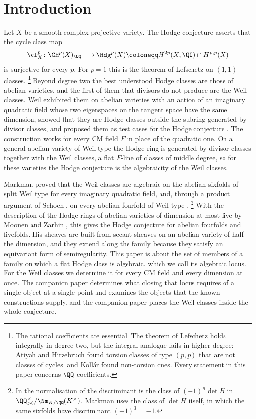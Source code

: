 \section{Introduction}\label{sec:intro}


Let $X$ be a smooth complex projective variety. The Hodge conjecture asserts
that the cycle class map
\[
  \cl^{p}_{X}\colon \CH^{p}(X)_{\QQ}\longrightarrow \Hdg^{p}(X)
  \coloneqq H^{2p}(X,\QQ)\cap H^{p,p}(X)
\]
is surjective for every $p$. For $p=1$ this is the theorem of Lefschetz on
$(1,1)$ classes.%
\footnote{The rational coefficients are essential. The theorem of Lefschetz
holds integrally in degree two, but the integral analogue fails in higher
degree: Atiyah and Hirzebruch found torsion classes of type $(p,p)$ that are
not classes of cycles, and Koll\'ar found non-torsion ones. Every statement in
this paper concerns $\QQ$-coefficients.}
Beyond degree two the best understood Hodge classes are those of abelian
varieties, and the first of them that divisors do not produce are the Weil
classes. Weil exhibited them on abelian varieties with an action of an
imaginary quadratic field whose two eigenspaces on the tangent space have the
same dimension, showed that they are Hodge classes outside the subring
generated by divisor classes, and proposed them as test cases for the Hodge
conjecture \cite{Weil77}. The construction works for every CM field $F$ in
place of the quadratic one. On a general abelian variety of Weil type the
Hodge ring is generated by divisor classes together with the Weil classes, a
flat $F$-line of classes of middle degree, so for these varieties the Hodge
conjecture is the algebraicity of the Weil classes.

Markman proved that the Weil classes are algebraic on the abelian sixfolds of
split Weil type for every imaginary quadratic field, and, through a product
argument of Schoen \cite[Proposition~10]{Sch98}, on every abelian fourfold of
Weil type \cite{Mar25a,Mar25b}.%
\footnote{In the normalisation of  the discriminant is the
class of $(-1)^{n}\det H$ in $\QQ^{\times}_{>0}/\Nm_{K/\QQ}(K^{\times})$.
Markman uses the class of $\det H$ itself, in which the same sixfolds have
discriminant $(-1)^{3}=-1$.}
With the description of the Hodge rings of abelian varieties of dimension at
most five by Moonen and Zarhin \cite{MZ99}, this gives the Hodge conjecture
for abelian fourfolds and fivefolds. His sheaves are built from secant sheaves
on an abelian variety of half the dimension, and they extend along the family
because they satisfy an equivariant form of semiregularity. This paper is
about the set of members of a family on which a flat Hodge class is
algebraic, which we call its algebraic locus. For the Weil classes we
determine it for every CM field and every dimension at once. The companion
paper \cite{paperII} determines what closing that locus requires of a single
object at a single point and examines the objects that the known
constructions supply, and the companion paper \cite{paperIII} places the
Weil classes inside the whole conjecture.

